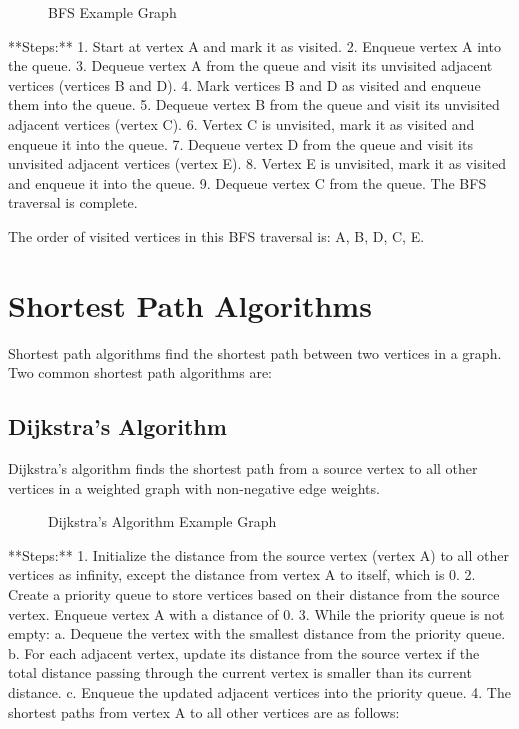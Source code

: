 \documentclass{article}
\begin{document}
\begin{figure}[h]
    \centering
    \caption{BFS Example Graph}
\end{figure}

**Steps:**
1. Start at vertex A and mark it as visited.
2. Enqueue vertex A into the queue.
3. Dequeue vertex A from the queue and visit its unvisited adjacent vertices (vertices B and D).
4. Mark vertices B and D as visited and enqueue them into the queue.
5. Dequeue vertex B from the queue and visit its unvisited adjacent vertices (vertex C).
6. Vertex C is unvisited, mark it as visited and enqueue it into the queue.
7. Dequeue vertex D from the queue and visit its unvisited adjacent vertices (vertex E).
8. Vertex E is unvisited, mark it as visited and enqueue it into the queue.
9. Dequeue vertex C from the queue. The BFS traversal is complete.

The order of visited vertices in this BFS traversal is: A, B, D, C, E.

\section{Shortest Path Algorithms}
Shortest path algorithms find the shortest path between two vertices in a graph. Two common shortest path algorithms are:

\subsection{Dijkstra's Algorithm}
Dijkstra's algorithm finds the shortest path from a source vertex to all other vertices in a weighted graph with non-negative edge weights.

\begin{figure}[h]
    \centering
    \caption{Dijkstra's Algorithm Example Graph}
\end{figure}

**Steps:**
1. Initialize the distance from the source vertex (vertex A) to all other vertices as infinity, except the distance from vertex A to itself, which is 0.
2. Create a priority queue to store vertices based on their distance from the source vertex. Enqueue vertex A with a distance of 0.
3. While the priority queue is not empty:
   a. Dequeue the vertex with the smallest distance from the priority queue.
   b. For each adjacent vertex, update its distance from the source vertex if the total distance passing through the current vertex is smaller than its current distance.
   c. Enqueue the updated adjacent vertices into the priority queue.
4. The shortest paths from vertex A to all other vertices are as follows:
\end{document}
